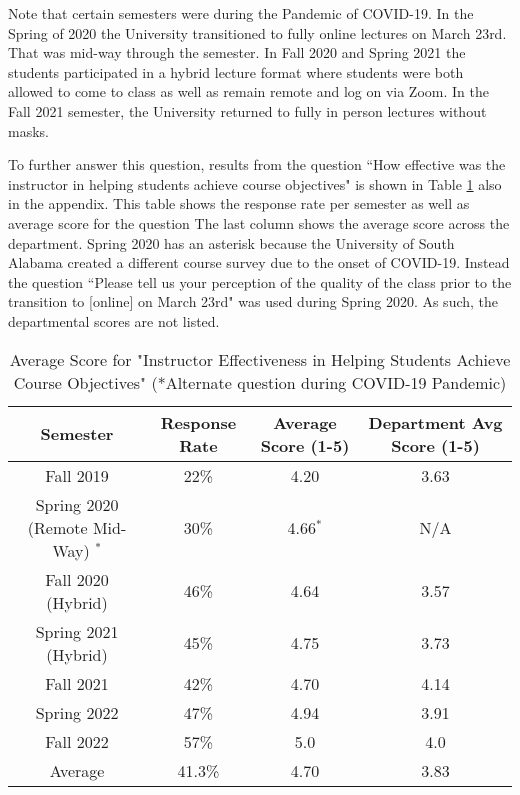 Note that certain semesters were during the Pandemic of COVID-19. In
the Spring of 2020 the University transitioned to fully online
lectures on March 23rd. That was mid-way through the semester. In Fall
2020 and Spring 2021 the students participated in a hybrid lecture
format where students were both allowed to come to class as well as
remain remote and log on via Zoom. In the Fall 2021 semester, the
University returned to fully in person lectures without masks.   

To further answer this question, results from the
question ``How effective was the instructor in helping students
achieve course objectives" is shown in Table \ref{tab:scores} also in
the appendix. This table shows the response rate per semester as well
as average score for the question  The last column shows the average
score across the department. Spring 2020 has an asterisk because the
University of South Alabama created a different course survey due to
the onset of COVID-19. Instead the question ``Please tell us your
perception of the quality of the class prior to the transition to
[online] on March 23rd" was used during Spring 2020. As such, the
departmental scores are not listed.

\begin{table}[H]
    \centering
    \begin{tabular}{c|c|c|c}
        Semester &  Response Rate & Average Score (1-5) & Department Avg Score (1-5) \\
        \hline 
        \hline
        Fall 2019 & 22\% & 4.20 & 3.63 \\
        \hline
        Spring 2020 (Remote Mid-Way) $^*$ & 30\% & 4.66$^*$ & N/A \\
        \hline
        Fall 2020 (Hybrid) & 46\% & 4.64 & 3.57 \\
        \hline
        Spring 2021 (Hybrid) & 45\% & 4.75 & 3.73 \\
        \hline
        Fall 2021 & 42\% & 4.70 & 4.14 \\
        \hline
        Spring 2022 & 47\% & 4.94 & 3.91 \\
        \hline
        Fall 2022 & 57\% & 5.0 & 4.0 \\
        \hline
        Average & 41.3\% & 4.70 & 3.83 \\
    \end{tabular}
    \caption{Average Score for "Instructor Effectiveness in Helping Students Achieve Course Objectives" (*Alternate question during COVID-19 Pandemic)}
    \label{tab:scores}
\end{table}

